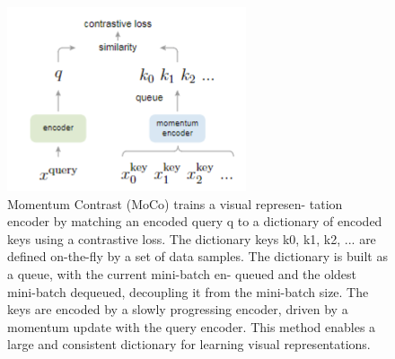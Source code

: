 \documentclass[10pt,twocolumn]{article}  %
\begin{document}
\begin{figure}[t]
    \centering
    \includegraphics[width=0.75\linewidth]{Pic/figure1.png} %
    \caption{Momentum Contrast (MoCo) trains a visual represen-
    tation encoder by matching an encoded query q to a dictionary
    of encoded keys using a contrastive loss. The dictionary keys
    {k0, k1, k2, ...} are defined on-the-fly by a set of data samples.
    The dictionary is built as a queue, with the current mini-batch en-
    queued and the oldest mini-batch dequeued, decoupling it from
    the mini-batch size. The keys are encoded by a slowly progressing
    encoder, driven by a momentum update with the query encoder.
    This method enables a large and consistent dictionary for learning
    visual representations.} %
    \label{fig:Figure 1} %
    \vspace{-1em} %
\end{figure}
\end{document}
